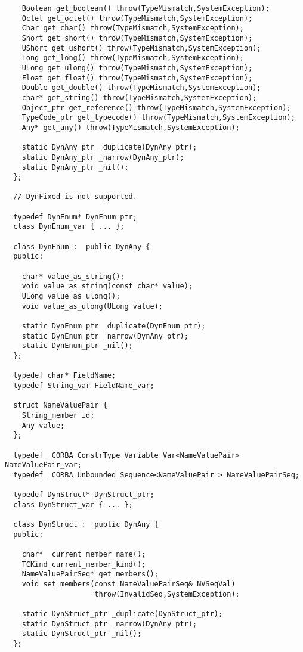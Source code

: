 \documentclass[11pt,twoside,onecolumn]{book}
\begin{document}
{\begin{verbatim}
    Boolean get_boolean() throw(TypeMismatch,SystemException);
    Octet get_octet() throw(TypeMismatch,SystemException);
    Char get_char() throw(TypeMismatch,SystemException);
    Short get_short() throw(TypeMismatch,SystemException);
    UShort get_ushort() throw(TypeMismatch,SystemException);
    Long get_long() throw(TypeMismatch,SystemException);
    ULong get_ulong() throw(TypeMismatch,SystemException);
    Float get_float() throw(TypeMismatch,SystemException);
    Double get_double() throw(TypeMismatch,SystemException);
    char* get_string() throw(TypeMismatch,SystemException);
    Object_ptr get_reference() throw(TypeMismatch,SystemException);
    TypeCode_ptr get_typecode() throw(TypeMismatch,SystemException);
    Any* get_any() throw(TypeMismatch,SystemException);

    static DynAny_ptr _duplicate(DynAny_ptr);
    static DynAny_ptr _narrow(DynAny_ptr);
    static DynAny_ptr _nil();
  };

  // DynFixed is not supported.

  typedef DynEnum* DynEnum_ptr;
  class DynEnum_var { ... };

  class DynEnum :  public DynAny {
  public:

    char* value_as_string();
    void value_as_string(const char* value);
    ULong value_as_ulong();
    void value_as_ulong(ULong value);

    static DynEnum_ptr _duplicate(DynEnum_ptr);
    static DynEnum_ptr _narrow(DynAny_ptr);
    static DynEnum_ptr _nil();
  };

  typedef char* FieldName;
  typedef String_var FieldName_var;

  struct NameValuePair {
    String_member id;
    Any value;
  };

  typedef _CORBA_ConstrType_Variable_Var<NameValuePair> NameValuePair_var;
  typedef _CORBA_Unbounded_Sequence<NameValuePair > NameValuePairSeq;

  typedef DynStruct* DynStruct_ptr;
  class DynStruct_var { ... };

  class DynStruct :  public DynAny {
  public:

    char*  current_member_name();
    TCKind current_member_kind();
    NameValuePairSeq* get_members();
    void set_members(const NameValuePairSeq& NVSeqVal)
                     throw(InvalidSeq,SystemException);

    static DynStruct_ptr _duplicate(DynStruct_ptr);
    static DynStruct_ptr _narrow(DynAny_ptr);
    static DynStruct_ptr _nil();
  };


\end{verbatim}}
\end{document}
